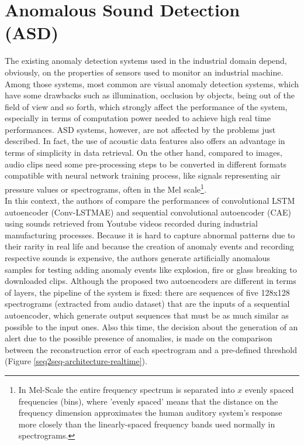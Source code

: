 \section{Anomalous Sound Detection (ASD)}
The existing anomaly detection systems used in the industrial domain depend, obviously, on the properties of sensors used to monitor an industrial machine. Among those systems, most common are visual anomaly detection systems, which have some drawbacks such as illumination, occlusion by objects, being out of the field of view and so forth, which strongly affect the performance of the system, especially in terms of computation power needed to achieve high real time performances. ASD systems, however, are not affected by the problems just described. In fact, the use of acoustic data features also offers an advantage in terms of simplicity in data retrieval. On the other hand, compared to images, audio clips need some pre-processing steps to be converted in different formats compatible with neural network training process, like signals representing air pressure values or spectrograms, often in the Mel scale\footnote{In Mel-Scale the entire frequency spectrum is separated into $x$ evenly spaced frequencies (bins), where 'evenly spaced' means that the distance on the frequency dimension approximates the human auditory system’s response more closely than the linearly-spaced frequency bands used normally in spectrograms.}.\\
In this context, the authors of \cite{13RealTimeDetectionUsingSequentialAutoencoder} compare the performances of convolutional LSTM autoencoder (Conv-LSTMAE)  and sequential convolutional autoencoder (CAE) using sounds retrieved from Youtube videos recorded during industrial manufacturing processes. Because it is hard to capture abnormal patterns due to their rarity in real life and because the creation of anomaly events and recording respective sounds is expensive, the authors generate artificially anomalous samples for testing adding anomaly events like explosion, fire or glass breaking to downloaded clips. Although the proposed two autoencoders are different in terms of layers, the pipeline of the system is fixed: there are sequences of five 128x128 spectrograms (extracted from audio dataset) that are the inputs of a sequential autoencoder, which generate output sequences that must be as much similar as possible to the input ones. Also this time, the decision about the generation of an alert due to the possible presence of anomalies, is made on the comparison between the reconstruction error of each spectrogram and a pre-defined threshold (Figure \ref{seq2seq-architecture-realtime}).

